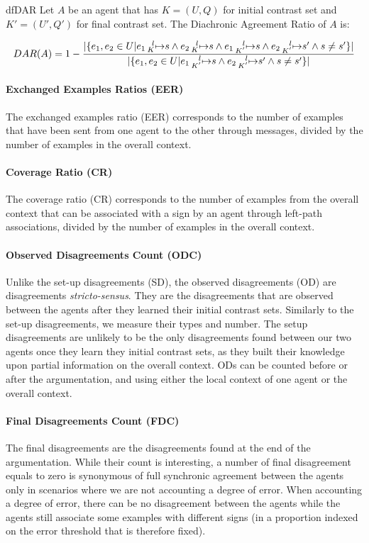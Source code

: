 \begin{restatable}[DAR]{df}{DAR}
\label{def:DAR}
Let $A$ be an agent that has $K = (U,Q)$ for initial contrast set and $K' = (U',Q')$ for final contrast set. The Diachronic Agreement Ratio of $A$ is:

\[
DAR(A) = 1 - \frac{| \{e_{1},e_{2} \in U | e_{1} \prescript{l}{K}{\mapsto} s \wedge e_{2} \prescript{l}{K}{\mapsto} s  \wedge e_{1} \prescript{l}{K'}{\mapsto} s \wedge e_{2} \prescript{l}{K'}{\mapsto} s' \wedge s \neq s' \} |}{| \{e_{1},e_{2} \in U | e_{1} \prescript{l}{K'}{\mapsto} s \wedge e_{2} \prescript{l}{K'}{\mapsto} s' \wedge s \neq s' \} |}
\]

\end{restatable}

\paragraph{Exchanged Examples Ratios (EER)} The exchanged examples ratio (EER) corresponds to the number of examples that have been sent from one agent to the other through messages, divided by the number of examples in the overall context.

\paragraph{Coverage Ratio (CR)} The coverage ratio (CR) corresponds to the number of examples from the overall context that can be associated with a sign by an agent through left-path associations, divided by the number of examples in the overall context.

\paragraph{Observed Disagreements Count (ODC)} Unlike the set-up disagreements (SD), the observed disagreements (OD) are disagreements \emph{stricto-sensus}. They are the disagreements that are observed between the agents after they learned their initial contrast sets. Similarly to the set-up disagreements, we measure their types and number. The setup disagreements are unlikely to be the only disagreements found between our two agents once they learn they initial contrast sets, as they built their knowledge upon partial information on the overall context. ODs can be counted before or after the argumentation, and using either the local context of one agent or the overall context.

\paragraph{Final Disagreements Count (FDC)} The final disagreements are the disagreements found at the end of the argumentation. While their count is interesting, a number of final disagreement equals to zero is synonymous of full synchronic agreement between the agents only in scenarios where we are not accounting a degree of error. When accounting a degree of error, there can be no disagreement between the agents while the agents still associate some examples with different signs (in a proportion indexed on the error threshold that is therefore fixed).

